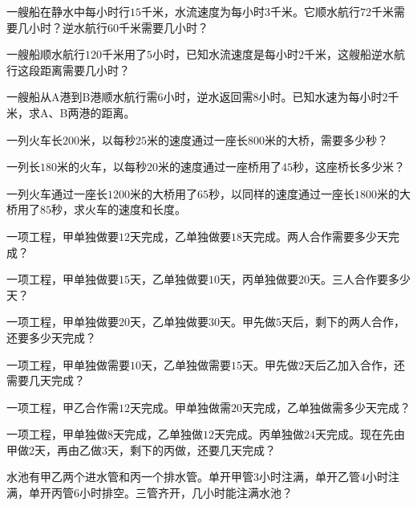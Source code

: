 \documentclass[a4paper,12pt]{ctexart}
\begin{document}
\begin{exercise}
\item 一艘船在静水中每小时行$15$千米，水流速度为每小时$3$千米。它顺水航行$72$千米需要几小时？逆水航行$60$千米需要几小时？

\item 一艘船顺水航行$120$千米用了$5$小时，已知水流速度是每小时$2$千米，这艘船逆水航行这段距离需要几小时？

\item 一艘船从A港到B港顺水航行需$6$小时，逆水返回需$8$小时。已知水速为每小时$2$千米，求A、B两港的距离。
\end{exercise}


\begin{exercise}
\item 一列火车长$200$米，以每秒$25$米的速度通过一座长$800$米的大桥，需要多少秒？

\item 一列长$180$米的火车，以每秒$20$米的速度通过一座桥用了$45$秒，这座桥长多少米？

\item 一列火车通过一座长$1200$米的大桥用了$65$秒，以同样的速度通过一座长$1800$米的大桥用了$85$秒，求火车的速度和长度。
\end{exercise}

\newpage



\begin{exercise}
\item 一项工程，甲单独做要$12$天完成，乙单独做要$18$天完成。两人合作需要多少天完成？

\item 一项工程，甲单独做要$15$天，乙单独做要$10$天，丙单独做要$20$天。三人合作要多少天？

\item 一项工程，甲单独做要$20$天，乙单独做要$30$天。甲先做$5$天后，剩下的两人合作，还要多少天完成？

\item 一项工程，甲单独做需要$10$天，乙单独做需要$15$天。甲先做$2$天后乙加入合作，还需要几天完成？

\item 一项工程，甲乙合作需$12$天完成。甲单独做需$20$天完成，乙单独做需多少天完成？

\item 一项工程，甲单独做$8$天完成，乙单独做$12$天完成。丙单独做$24$天完成。现在先由甲做$2$天，再由乙做$3$天，剩下的丙做，还要几天完成？

\item 水池有甲乙两个进水管和丙一个排水管。单开甲管$3$小时注满，单开乙管$4$小时注满，单开丙管$6$小时排空。三管齐开，几小时能注满水池？
\end{exercise}
\end{document}
